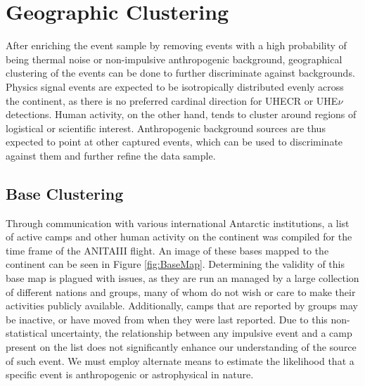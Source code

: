 \section{Geographic Clustering}
	After enriching the event sample by removing events with a high probability of being thermal noise or non-impulsive anthropogenic background, geographical clustering of the events can be done to further discriminate against backgrounds. Physics signal events are expected to be isotropically distributed evenly across the continent, as there is no preferred cardinal direction for UHECR or UHE$\nu$ detections.  Human activity, on the other hand, tends to cluster around regions of logistical or scientific interest.  Anthropogenic background sources are thus expected to point at other captured events, which can be used to discriminate against them and further refine the data sample. 

	\subsection{Base Clustering}
		Through communication with various international Antarctic institutions, a list of active camps and other human activity on the continent was compiled for the time frame of the ANITAIII flight.  An image of these bases mapped to the continent can be seen in Figure \ref{fig:BaseMap}.  Determining the validity of this base map is plagued with issues, as they are run an managed by a large collection of different nations and groups, many of whom do not wish or care to make their activities publicly available.  Additionally, camps that are reported by groups may be inactive, or have moved from when they were last reported.  Due to this non-statistical uncertainty, the relationship between any impulsive event and a camp present on the list does not significantly enhance our understanding of the source of such event.  We must employ alternate means to estimate the likelihood that a specific event is anthropogenic or astrophysical in nature.
		
